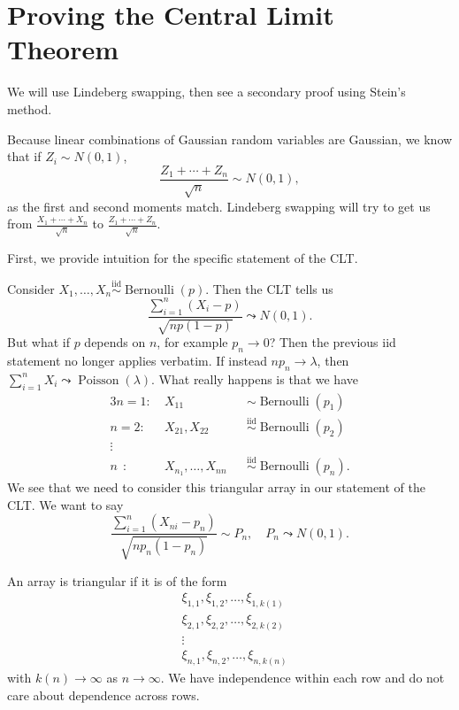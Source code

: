 \section{Proving the Central Limit Theorem}

We will use Lindeberg swapping, then see a secondary proof using Stein's method.

Because linear combinations of Gaussian random variables are Gaussian, we know that if $Z_i \sim N(0,1)$, \[
	\frac{Z_1 + \cdots + Z_n}{\sqrt{n} } \sim N(0,1)
,\] as the first and second moments match. Lindeberg swapping will try to get us from $\frac{X_1 + \cdots + X_n}{\sqrt{n} }$ to $\frac{Z_1 + \cdots + Z_n}{\sqrt{n} }$.

First, we provide intuition for the specific statement of the CLT.

\begin{aside}
	Consider $X_1,\ldots,X_n \overset{\text{iid}}{\sim} \operatorname{Bernoulli}(p)$. Then the CLT tells us \[
		\frac{\sum\limits_{i=1}^{n} \left( X_i - p \right)}{\sqrt{n p \left( 1-p \right)} } \leadsto N(0,1)
	.\] But what if $p$ depends on $n$, for example $p_n \to 0$? Then the previous iid statement no longer applies verbatim. If instead $np_n \to \lambda$, then $\sum\limits_{i=1}^{n} X_i \leadsto \operatorname{Poisson}(\lambda)$.
	What really happens is that we have 
	\begin{alignat*}{3}
		n=1: &\ X_{11} &&\sim \operatorname{Bernoulli}(p_1) \\
		n=2: &\ X_{21}, X_{22} &&\overset{\text{iid}}{\sim} \operatorname{Bernoulli}(p_2) \\
		\vdots\ \  \ \  & &&\\
		n\ \ :&\ X_{n_1},\ldots,X_{nn} &&\overset{\text{iid}}{\sim} \operatorname{Bernoulli}(p_n)
	.\end{alignat*}
	We see that we need to consider this triangular array in our statement of the CLT. We want to say \[
		\frac{\sum\limits_{i=1}^{n} \left( X_{ni} - p_n \right)}{\sqrt{np_n (1-p_n)} } \sim P_n, \quad P_n \leadsto N(0,1)
	.\] 
\end{aside}
\begin{definition}
	An array is triangular if it is of the form
	\begin{align*}
		&\xi_{1,1}, \xi_{1,2},\ldots,\xi_{1,k(1)} \\
		&\xi_{2,1}, \xi_{2,2},\ldots,\xi_{2,k(2)}\\
		&\vdots \\
		&\xi_{n, 1},\xi_{n, 2}, \ldots, \xi_{n, k(n)}
	\end{align*}
	with $k(n) \to \infty$ as $n\to \infty$. We have independence within each row and do not care about dependence across rows.
\end{definition}
